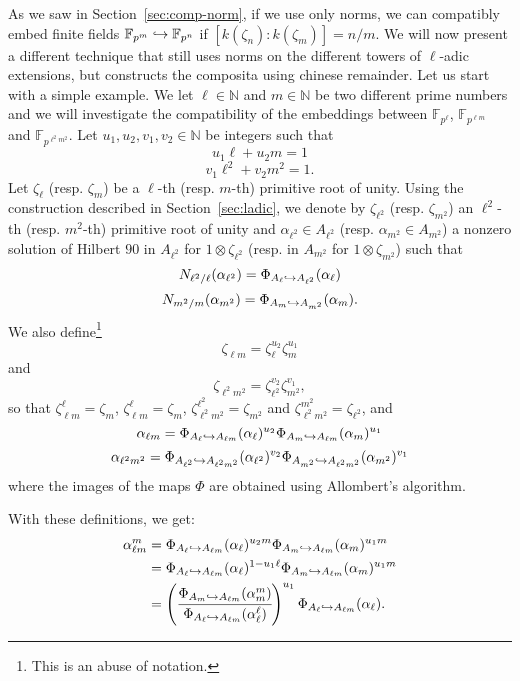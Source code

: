 \documentclass[a4paper,11pt]{article}
\begin{document}
As we saw in Section~\ref{sec:comp-norm}, if we use only norms, we can 
compatibly embed finite fields $\mathbb{F}_{p^m}\hookrightarrow\mathbb{F}_{p^n}$ if
$[k(\zeta_n):k(\zeta_m)]=n/m$. We will now present a different technique that
still uses norms on the different towers of $\ell$-adic extensions, but
constructs the composita using chinese remainder. Let us start with a simple
example. We let $\ell\in\mathbb{N}$ and $m\in\mathbb{N}$ be two different prime numbers and we will
investigate the compatibility of the embeddings between $\mathbb{F}_{p^\ell}$,
$\mathbb{F}_{p^{\ell m}}$ and $\mathbb{F}_{p^{\ell^2 m^2}}$. Let $u_1, u_2, v_1,
v_2\in \mathbb{N}$ be integers such that
\[
  u_1\ell+u_2m=1
\]
\[
  v_1\ell^2+v_2m^2=1.
\]
Let $\zeta_\ell$ (resp. $\zeta_m$) be a $\ell$-th (resp. $m$-th) primitive root
of unity. Using the construction described in Section~\ref{sec:ladic}, we denote
by $\zeta_{\ell^2}$ (resp. $\zeta_{m^2}$) an $\ell^2$-th (resp. $m^2$-th)
primitive root of unity and $\alpha_{\ell^2}\in A_{\ell^2}$ (resp.
$\alpha_{m^2}\in A_{m^2}$) a nonzero solution of Hilbert $90$ in $A_{\ell^2}$
for $1\otimes\zeta_{\ell^2}$ (resp. in $A_{m^2}$ for $1\otimes\zeta_{m^2}$) such that
\[
  N_{\ell^2/\ell}(\alpha_{\ell^2})=\Phi_{A_\ell\hookrightarrow A_{\ell^2}}(\alpha_\ell)
\]
\[
  N_{m^2/m}(\alpha_{m^2})=\Phi_{A_m\hookrightarrow A_{m^2}}(\alpha_m).
\]
We also define\footnote{This is an abuse of notation.}
\[
  \zeta_{\ell m}=\zeta_\ell^{u_2}\zeta_{m}^{u_1}
\]
and
\[
  \zeta_{\ell^2 m^2}=\zeta_{\ell^2}^{v_2}\zeta_{m^2}^{v_1},
\]
so that $\zeta_{\ell m}^\ell = \zeta_m$, $\zeta_{\ell m}^\ell=\zeta_m$,
$\zeta_{\ell^2m^2}^{\ell^2}=\zeta_{m^2}$ and $\zeta_{\ell^2
m^2}^{m^2}=\zeta_{\ell^2}$, and
\[
  \alpha_{\ell m}=\Phi_{A_\ell\hookrightarrow A_{\ell m}}(\alpha_\ell)^{u_2}\Phi_{A_m\hookrightarrow
    A_{\ell m}}(\alpha_m)^{u_1}
\]
\[
  \alpha_{\ell^2 m^2}=\Phi_{A_{\ell^2}\hookrightarrow A_{\ell^2
  m^2}}(\alpha_{\ell^2})^{v_2}\Phi_{A_{m^2}\hookrightarrow
  A_{\ell^2 m^2}}(\alpha_{m^2})^{v_1}
\]
where the images of the maps $\Phi$ are obtained using Allombert's algorithm.

With these definitions, we get:
\begin{align*}
  \alpha_{\ell m}^m &= \Phi_{A_\ell\hookrightarrow A_{\ell m}}(\alpha_\ell)^{u_2m}\Phi_{A_m\hookrightarrow
    A_{\ell m}}(\alpha_m)^{u_1m} \\
  &= \Phi_{A_\ell\hookrightarrow A_{\ell m}}(\alpha_\ell)^{1-u_1\ell}\Phi_{A_m\hookrightarrow
    A_{\ell m}}(\alpha_m)^{u_1m} \\
    &= \left( \cfrac{\Phi_{A_m\hookrightarrow A_{\ell m}}(\alpha_{m}^m)}{\Phi_{A_\ell\hookrightarrow A_{\ell
    m}}(\alpha_\ell^\ell)}\right)^{u_1} \Phi_{A_\ell\hookrightarrow A_{\ell
    m}}(\alpha_\ell).
\end{align*}
\end{document}
